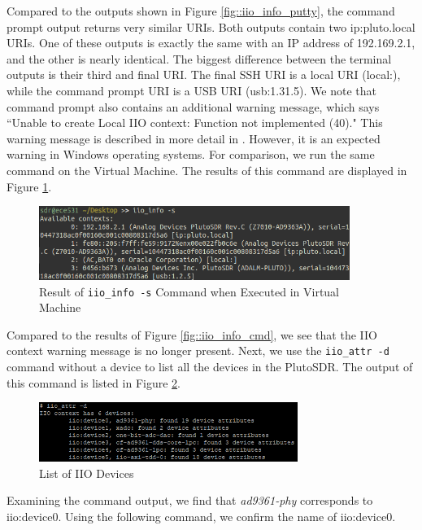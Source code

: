 \documentclass{article}
\begin{document}
Compared to the outputs shown in Figure \ref{fig::iio_info_putty}, the command prompt output returns very similar URIs. Both outputs contain two ip:pluto.local URIs. One of these outputs is exactly the same with an IP address of 192.169.2.1, and the other is nearly identical. The biggest difference between the terminal outputs is their third and final URI. The final SSH URI is a local URI (local:), while the command prompt URI is a USB URI (usb:1.31.5). We note that command prompt also contains an additional warning message, which says ``Unable to create Local IIO context: Function not implemented (40)." This warning message is described in more detail in \cite{analog_devices_libiio_error}. However, it is an expected warning in Windows operating systems. For comparison, we run the same command on the Virtual Machine. The results of this command are displayed in Figure \ref{fig::iio_info_vm}.

\begin{figure}[H]
	\centerline{\includegraphics[width=0.9\textwidth]{iio_info_vm.png}}
	\caption{Result of \texttt{iio\_info -s} Command when Executed in Virtual Machine}
	\label{fig::iio_info_vm}
\end{figure}

Compared to the results of Figure \ref{fig::iio_info_cmd}, we see that the IIO context warning message is no longer present. Next, we use the \texttt{iio\_attr -d} command without a device to list all the devices in the PlutoSDR. The output of this command is listed in Figure \ref{fig::iio_devices}.

\begin{figure}[H]
	\centerline{\includegraphics[width=0.75\textwidth]{iio_devices.png}}
	\caption{List of IIO Devices}
	\label{fig::iio_devices}
\end{figure}


Examining the command output, we find that \textit{ad9361-phy} corresponds to iio:device0. Using the following command, we confirm the name of iio:device0.
\end{document}
